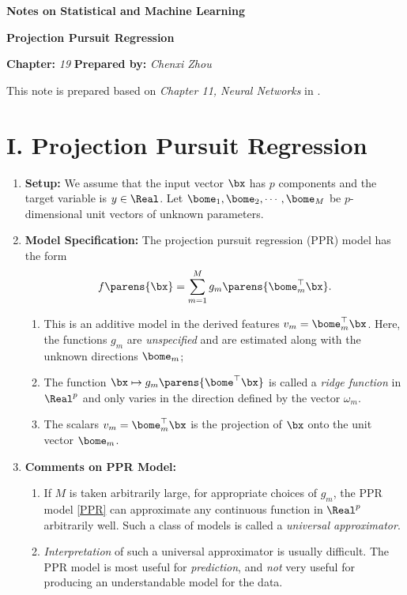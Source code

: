 \documentclass[12pt]{article}
\newcommand{\titlebox}[4]{
\begin{tcolorbox}[colback = blue!5!white!95, colframe = blue!70!black
]
  \noindent \textbf{ #1 } \hfill \textit{#2} 
  \begin{center}
  	 \LARGE{\textbf{#3}}
  \end{center}
\textbf{Chapter:} \textit{#4} \hfill \textbf{Prepared by:} \textit{Chenxi Zhou}
\end{tcolorbox}
}
\begin{document}
\titlebox{Notes on Statistical and Machine Learning}{}{Projection Pursuit Regression}{19}
\thispagestyle{plain}

\vspace{10pt}

This note is prepared based on \textit{Chapter 11, Neural Networks} in \textcite{Friedman2001-np}. 


\section*{I. Projection Pursuit Regression} 

\begin{enumerate}[label=\textbf{\arabic*.}]
	
	\item \textbf{Setup:} We assume that the input vector $\bx$ has $p$ components and the target variable is $y \in \Real$. Let $\bome_1, \bome_2, \cdots, \bome_M$ be $p$-dimensional unit vectors of unknown parameters. 
	
	\item \textbf{Model Specification:} The projection pursuit regression (PPR) model has the form 
	\begin{equation}\label{PPR}
		f \parens{\bx} = \sum_{m=1}^M g_m \parens{\bome_m^\top \bx}. 
	\end{equation}
	\begin{enumerate}
		\item This is an additive model in the derived features $v_m = \bome_m^\top \bx$. Here, the functions $g_m$ are \emph{unspecified} and are estimated along with the unknown directions $\bome_m$; 
		\item The function $\bx \mapsto g_m \parens{\bome^\top \bx}$ is called a \textit{ridge function} in $\Real^p$ and only varies in the direction defined by the vector $\omega_m$. 
		\item The scalars $v_m = \bome_m^\top \bx$ is the projection of $\bx$ onto the unit vector $\bome_m$. 
	\end{enumerate}
	
	\item \textbf{Comments on PPR Model:}
	\begin{enumerate}
		\item If $M$ is taken arbitrarily large, for appropriate choices of $g_m$, the PPR model \eqref{PPR} can approximate any continuous function in $\Real^p$ arbitrarily well. Such a class of models is called a \textit{universal approximator}. 
		\item \textit{Interpretation} of such a universal approximator is usually difficult. The PPR model is most useful for \textit{prediction}, and \emph{not} very useful for producing an understandable model for the data. 
		

\end{enumerate}
\end{enumerate}
\end{document}
